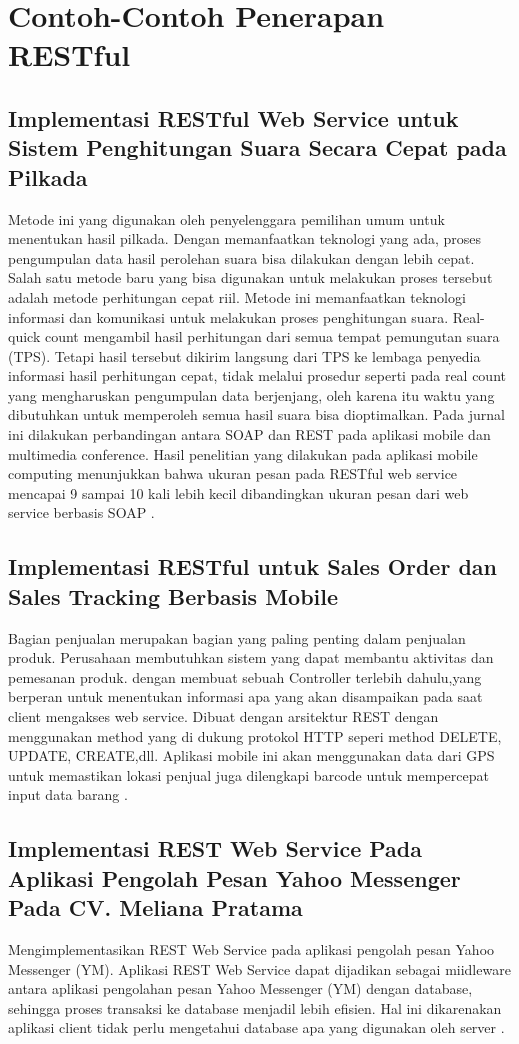 \section{Contoh-Contoh Penerapan  RESTful}
\subsection{Implementasi RESTful Web Service untuk Sistem Penghitungan Suara Secara Cepat pada Pilkada}
Metode ini yang digunakan oleh penyelenggara pemilihan umum untuk menentukan hasil pilkada. Dengan memanfaatkan teknologi yang ada, proses pengumpulan data hasil perolehan suara bisa dilakukan dengan lebih cepat. Salah satu metode baru yang bisa digunakan untuk melakukan proses tersebut adalah metode perhitungan cepat riil. Metode ini memanfaatkan teknologi informasi dan komunikasi untuk melakukan proses penghitungan suara. Real-quick count mengambil hasil perhitungan dari semua tempat pemungutan suara (TPS). Tetapi hasil tersebut dikirim langsung dari TPS ke lembaga penyedia informasi hasil perhitungan cepat, tidak melalui prosedur seperti pada real count yang mengharuskan pengumpulan data berjenjang, oleh karena itu waktu yang dibutuhkan untuk memperoleh semua hasil suara bisa dioptimalkan. Pada jurnal ini dilakukan perbandingan antara SOAP dan REST pada aplikasi mobile dan multimedia conference. Hasil penelitian yang dilakukan pada aplikasi mobile computing menunjukkan bahwa ukuran pesan pada RESTful web service mencapai 9 sampai 10 kali lebih kecil dibandingkan ukuran pesan dari web service berbasis SOAP \cite{rofiq2017implementasi}.

\subsection{Implementasi RESTful untuk Sales Order dan Sales Tracking Berbasis Mobile}
Bagian penjualan merupakan bagian yang paling penting dalam penjualan produk. Perusahaan membutuhkan sistem yang dapat membantu aktivitas dan pemesanan produk. dengan membuat sebuah Controller terlebih dahulu,yang berperan untuk menentukan informasi apa yang akan disampaikan pada saat client mengakses web service. Dibuat dengan arsitektur REST dengan menggunakan method yang di dukung protokol HTTP seperi method DELETE, UPDATE, CREATE,dll. Aplikasi mobile ini akan menggunakan data dari GPS untuk memastikan lokasi penjual juga dilengkapi barcode untuk mempercepat input data barang \cite{kurniawan2015implementasi}.

\subsection{Implementasi REST Web Service Pada Aplikasi Pengolah Pesan Yahoo Messenger Pada CV. Meliana Pratama}
Mengimplementasikan REST Web Service pada aplikasi pengolah pesan Yahoo Messenger (YM). Aplikasi REST Web Service dapat dijadikan sebagai miidleware antara aplikasi pengolahan pesan Yahoo Messenger (YM) dengan database, sehingga proses transaksi ke database menjadil lebih efisien. Hal ini dikarenakan aplikasi client tidak perlu mengetahui database apa yang digunakan oleh server \cite{ikrom2015implementasi}.

